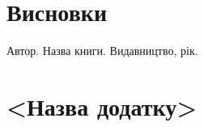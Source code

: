 \documentclass[14pt]{extreport}
\begin{document}
  \chapter*{Висновки}
  
  \renewcommand\bibname{\MakeUppercase{Список літератури}}
  \begin{thebibliography}{99}
     Автор. Назва книги. Видавництво, рік.
  \end{thebibliography}
  
  \appendix
  \renewcommand{\thechapter}{\Alph{chapter}}
  \renewcommand{\chaptername}{Додаток}
  
  \chapter{<Назва додатку>}
  
\end{document}
